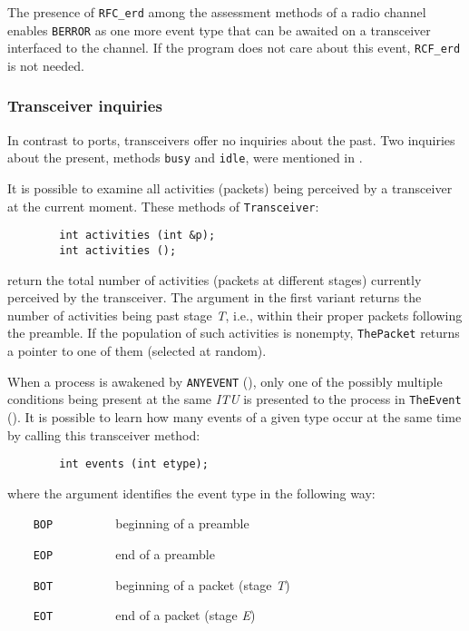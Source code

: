 \medskip

The presence of {\tt RFC\_erd} among the assessment methods of a radio
channel enables {\tt BERROR} as one more event type that can be awaited on
a transceiver interfaced to the channel.
If the program does not care about this event, {\tt RCF\_erd} is not needed.

\subsubsection{Transceiver inquiries}
\label{rm_tr_pp_ti}

In contrast to ports, transceivers offer no inquiries about the past.
Two inquiries about the present, methods {\tt busy} and {\tt idle},
were mentioned in .

It is possible to examine all activities (packets)
being perceived by a transceiver at the current moment.
These methods of {\tt Transceiver}:
\begin{verbatim}
        int activities (int &p);
        int activities ();
\end{verbatim}
\noindent
return the total number of activities (packets at different stages) currently
perceived by the transceiver.
The argument in
the first variant returns the number of activities
being past stage {\em T}, i.e., within their proper packets following the
preamble.
If the population of such activities is nonempty,
{\tt ThePacket} returns a pointer to one of them (selected at random).

When a process is awakened by {\tt ANYEVENT} (),
only one of the possibly multiple conditions being present at the same
{\em ITU\/} is presented to the process in {\tt TheEvent} ().
It is possible to learn how many events of a given type
occur at the same time by calling this transceiver method:
\begin{verbatim}
        int events (int etype);
\end{verbatim}
\noindent
where the argument identifies the event type in the following way:

\bigskip

\noindent
{\tt ~~~~BOP~~~~~~~~~} beginning of a preamble

\noindent
{\tt ~~~~EOP~~~~~~~~~} end of a preamble

\noindent
{\tt ~~~~BOT~~~~~~~~~} beginning of a packet (stage {\em T\/})

\noindent
{\tt ~~~~EOT~~~~~~~~~} end of a packet (stage {\em E\/})

